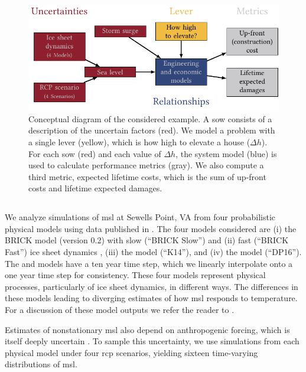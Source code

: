 \documentclass{agujournal2019}
\begin{document}
\begin{figure}
  \centering
  \includegraphics[width=\textwidth]{xlrm.pdf}
  \caption{
    Conceptual diagram of the considered example.
    A \acrfull{sow} consists of a description of the uncertain factors (red).
    We model a problem with a single lever (yellow), which is how high to elevate a house ($\Delta h$).
    For each \acrshort{sow} (red) and each value of $\Delta h$, the system model (blue) is used to calculate performance metrics (gray).
    We also compute a third metric, expected lifetime costs, which is the sum of up-front costs and lifetime expected damages.
  }\label{fig:xlrm}
\end{figure}

\subsection{}\label{sec:case-slr}

We analyze simulations of \gls{msl} at Sewells Point, VA from four probabilistic physical models using data published in .
The four models considered are (i) the BRICK model (version 0.2) with slow (``BRICK Slow'') and (ii) fast (``BRICK Fast'') ice sheet dynamics \cite{wong_brick0.2:2017}, (iii) the  model (``K14''), and (iv) the  model (``DP16'').
The  and  models have a ten year time step, which we linearly interpolate onto a one year time step for consistency.
These four models represent physical processes, particularly of ice sheet dynamics, in different ways.
The differences in these models leading to diverging estimates of how \gls{msl} responds to temperature.
For a discussion of these model outputs we refer the reader to .

Estimates of nonstationary \gls{msl} also depend on anthropogenic forcing, which is itself deeply uncertain \cite{ho_scenarios:2019,srikrishnan_probabilistic:2022}.
To sample this uncertainty, we use simulations from each physical model under four \gls{rcp} scenarios, yielding sixteen time-varying distributions of \gls{msl}.
\end{document}
